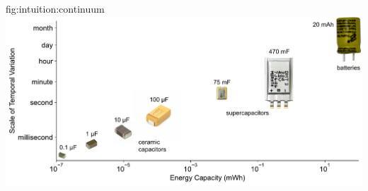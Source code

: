 \begin{definefigure}{fig:intuition:continuum}
    \centering
    \includegraphics[width=\columnwidth]{figs/chap3/continuum.pdf}
    \caption{
    The continuum of the efficacy of energy storage technologies for averaging and filtering power at different temporal scales. 
    Small energy buffers filter out high frequency power supply noise and spikes, while 
    larger energy capacities filter out power variance on larger temporal scales.
    }
\end{definefigure}